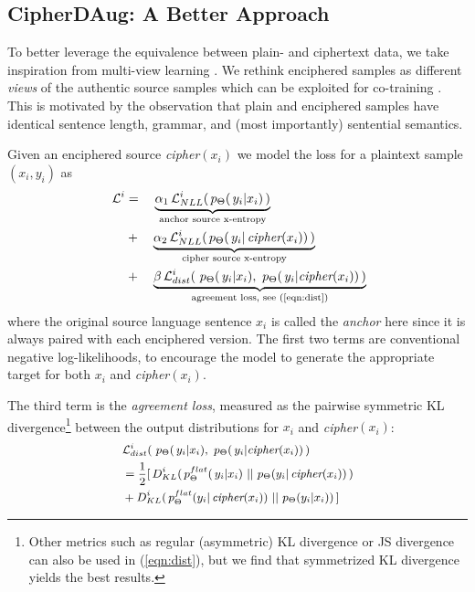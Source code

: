 \documentclass[11pt]{article}
\begin{document}
\subsection{CipherDAug: A Better Approach}\label{sec:cipherdaug}
To better leverage the equivalence between plain- and ciphertext data, we take inspiration from multi-view learning \cite{xu2013survey}. We rethink enciphered samples
as different \emph{views} of the authentic source samples which can be exploited for co-training \cite{blum1998combining}. This is motivated by the observation that plain and enciphered samples have identical sentence length, grammar, and (most importantly) sentential semantics. 

Given an enciphered source \textit{cipher}$(x_i)$ we model the loss for a plaintext sample $(x_i,y_i)$ as
\begin{equation}\label{eqn:totloss}
    \raisebox{-0.9em}{
    \makebox[0.5\columnwidth]{$
        \begin{aligned}
            \mathcal{L}^i &=\quad \underbrace{\alpha_{1}\,\mathcal{L}_{NLL}^i (\,p_\Theta(\,y_i |x_i)\,)}_{\text{anchor source x-entropy}}\\ 
            &+\quad \underbrace{\alpha_{2}\,\mathcal{L}_{NLL}^i (\,p_\Theta(\,y_i |\, \textit{cipher}(x_i))\,)}_{\text{cipher source x-entropy}} \\
            &+\quad  \underbrace{\beta\, \mathcal{L}_{dist}^i(\,\,p_\Theta(\,y_i |x_i),\,\,p_\Theta(\,y_i |\textit{cipher}(x_i)) \,)}_{\text{agreement loss, see (\ref{eqn:dist})}}
        \end{aligned}
    $}}
\end{equation}
where the original source language sentence $x_i$ is called the \emph{anchor} here since it is always paired with each enciphered version. The first two terms are conventional negative log-likelihoods, to encourage the model to generate the appropriate target for both $x_i$ and \textit{cipher}$(x_i)$.


The third term is the \textit{agreement loss}, measured as the pairwise symmetric KL divergence\footnote{
Other metrics such as regular (asymmetric) KL divergence or JS divergence can also be used in (\ref{eqn:dist}), but we find that symmetrized KL divergence yields the best results.
} between the output distributions for $x_i$ and \textit{cipher}$(x_i)$:
\begin{equation}\label{eqn:dist}
\small
\begin{split}
    \multicolumn{2}{l}{$\mathcal{L}_{dist}^i(\,\,p_\Theta(\,y_i |x_i),\,\,p_\Theta(\,y_i |\textit{cipher}(x_i))\,)$}\\
    &= \frac{1}{2}[\, D_{KL}^i(\,p_\Theta^{flat}(\,y_i |x_i)\,\, || \,\, p_\Theta(y_i |\, \textit{cipher}(x_i)) \,) \\
    &+ D_{KL}^i(\,p_\Theta^{flat}(y_i |\, \textit{cipher}(x_i))\,\, ||\,\, p_\Theta(y_i |x_i) ) \,]
\end{split}
\end{equation}
\end{document}
